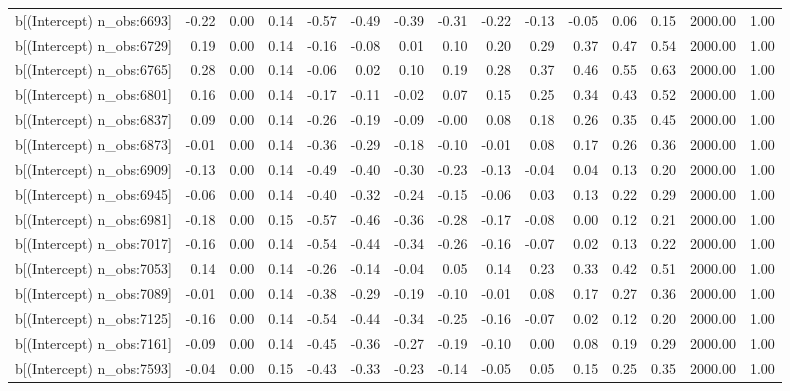 \begin{table}[ht]
\begin{tabular}{rrrrrrrrrrrrrrr}
  b[(Intercept) n\_obs:6693] & -0.22 & 0.00 & 0.14 & -0.57 & -0.49 & -0.39 & -0.31 & -0.22 & -0.13 & -0.05 & 0.06 & 0.15 & 2000.00 & 1.00 \\ 
  b[(Intercept) n\_obs:6729] & 0.19 & 0.00 & 0.14 & -0.16 & -0.08 & 0.01 & 0.10 & 0.20 & 0.29 & 0.37 & 0.47 & 0.54 & 2000.00 & 1.00 \\ 
  b[(Intercept) n\_obs:6765] & 0.28 & 0.00 & 0.14 & -0.06 & 0.02 & 0.10 & 0.19 & 0.28 & 0.37 & 0.46 & 0.55 & 0.63 & 2000.00 & 1.00 \\ 
  b[(Intercept) n\_obs:6801] & 0.16 & 0.00 & 0.14 & -0.17 & -0.11 & -0.02 & 0.07 & 0.15 & 0.25 & 0.34 & 0.43 & 0.52 & 2000.00 & 1.00 \\ 
  b[(Intercept) n\_obs:6837] & 0.09 & 0.00 & 0.14 & -0.26 & -0.19 & -0.09 & -0.00 & 0.08 & 0.18 & 0.26 & 0.35 & 0.45 & 2000.00 & 1.00 \\ 
  b[(Intercept) n\_obs:6873] & -0.01 & 0.00 & 0.14 & -0.36 & -0.29 & -0.18 & -0.10 & -0.01 & 0.08 & 0.17 & 0.26 & 0.36 & 2000.00 & 1.00 \\ 
  b[(Intercept) n\_obs:6909] & -0.13 & 0.00 & 0.14 & -0.49 & -0.40 & -0.30 & -0.23 & -0.13 & -0.04 & 0.04 & 0.13 & 0.20 & 2000.00 & 1.00 \\ 
  b[(Intercept) n\_obs:6945] & -0.06 & 0.00 & 0.14 & -0.40 & -0.32 & -0.24 & -0.15 & -0.06 & 0.03 & 0.13 & 0.22 & 0.29 & 2000.00 & 1.00 \\ 
  b[(Intercept) n\_obs:6981] & -0.18 & 0.00 & 0.15 & -0.57 & -0.46 & -0.36 & -0.28 & -0.17 & -0.08 & 0.00 & 0.12 & 0.21 & 2000.00 & 1.00 \\ 
  b[(Intercept) n\_obs:7017] & -0.16 & 0.00 & 0.14 & -0.54 & -0.44 & -0.34 & -0.26 & -0.16 & -0.07 & 0.02 & 0.13 & 0.22 & 2000.00 & 1.00 \\ 
  b[(Intercept) n\_obs:7053] & 0.14 & 0.00 & 0.14 & -0.26 & -0.14 & -0.04 & 0.05 & 0.14 & 0.23 & 0.33 & 0.42 & 0.51 & 2000.00 & 1.00 \\ 
  b[(Intercept) n\_obs:7089] & -0.01 & 0.00 & 0.14 & -0.38 & -0.29 & -0.19 & -0.10 & -0.01 & 0.08 & 0.17 & 0.27 & 0.36 & 2000.00 & 1.00 \\ 
  b[(Intercept) n\_obs:7125] & -0.16 & 0.00 & 0.14 & -0.54 & -0.44 & -0.34 & -0.25 & -0.16 & -0.07 & 0.02 & 0.12 & 0.20 & 2000.00 & 1.00 \\ 
  b[(Intercept) n\_obs:7161] & -0.09 & 0.00 & 0.14 & -0.45 & -0.36 & -0.27 & -0.19 & -0.10 & 0.00 & 0.08 & 0.19 & 0.29 & 2000.00 & 1.00 \\ 
  b[(Intercept) n\_obs:7593] & -0.04 & 0.00 & 0.15 & -0.43 & -0.33 & -0.23 & -0.14 & -0.05 & 0.05 & 0.15 & 0.25 & 0.35 & 2000.00 & 1.00 \\ 

\end{tabular}
\end{table}
